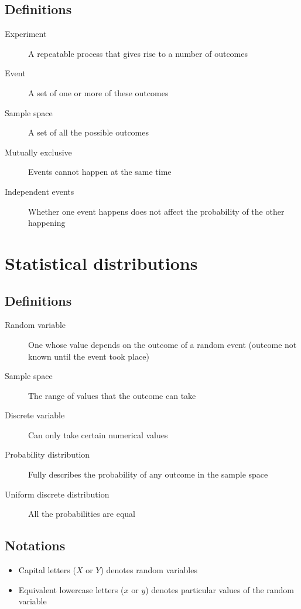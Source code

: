 \section{Definitions}
\begin{description}
	\item[Experiment] A repeatable process that gives rise to a number of outcomes
	\item[Event] A set of one or more of these outcomes
	\item[Sample space] A set of all the possible outcomes
	\item[Mutually exclusive] Events cannot happen at the same time
	\item[Independent events] Whether one event happens does not affect the probability of the other happening
\end{description}





\chapter{Statistical distributions}
\section{Definitions}
\begin{description}
	\item[Random variable] One whose value depends on the outcome of a random event (outcome not known until the event took place)
	\item[Sample space] The range of values that the outcome can take
	\item[Discrete variable] Can only take certain numerical values
	\item[Probability distribution] Fully describes the probability of any outcome in the sample space
	\item[Uniform discrete distribution] All the probabilities are equal
\end{description}

\section{Notations}
\begin{itemize}
	\item Capital letters ($X$ or $Y$) denotes random variables
	\item Equivalent lowercase letters ($x$ or $y$) denotes particular values of the random variable
\end{itemize}

